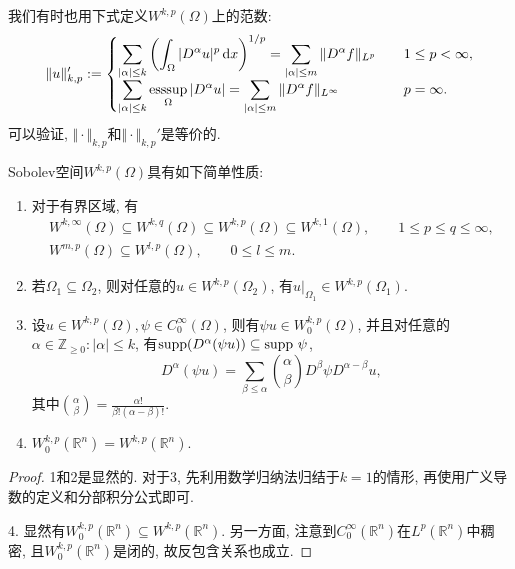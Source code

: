\begin{remark}
    我们有时也用下式定义$W^{k, p}(\Omega)$上的范数:
    \begin{equation*}
        \Vert u \Vert_{k, p}' := 
        \begin{cases}
            \displaystyle\sum_{|\alpha| \leq k}\left(\int_{\Omega}|D^{\alpha}u|^p \,{\rm d}x\right)^{1/p} = \sum_{|\alpha| \leq m}\Vert D^{\alpha}f\Vert_{L^p} \quad &1 \leq p < \infty, \\ 
            \displaystyle\sum_{|\alpha| \leq k}\mathop{{\rm esssup}}\limits_{\Omega}|D^{\alpha}u| = \sum_{|\alpha| \leq m}\Vert D^{\alpha}f\Vert_{L^{\infty}} \quad &p = \infty.
        \end{cases}
    \end{equation*}
    可以验证, $\Vert \cdot \Vert_{k, p}$和$\Vert \cdot \Vert_{k, p}'$是等价的.
\end{remark}

\begin{proposition}
    Sobolev空间$W^{k, p}(\Omega)$具有如下简单性质:
    \begin{enumerate}
        \item 对于有界区域, 有 
        \begin{gather*}
            W^{k, \infty}(\Omega) \subseteq W^{k, q}(\Omega) \subseteq W^{k, p}(\Omega) \subseteq W^{k, 1}(\Omega), \qquad 1 \leq p \leq q \leq \infty, \\ 
            W^{m, p}(\Omega) \subseteq W^{l, p}(\Omega), \qquad 0 \leq l \leq m.
        \end{gather*}
        \item 若$\Omega_1 \subseteq \Omega_2$, 则对任意的$u \in W^{k, p}(\Omega_2)$, 有$u|_{\Omega_1} \in W^{k, p}(\Omega_1)$.
        \item 设$u \in W^{k, p}(\Omega), \psi \in C_0^{\infty}(\Omega)$, 则有$\psi u \in W_0^{k, p}(\Omega)$, 并且对任意的$\alpha \in \mathbb{Z}_{\geq 0}\colon |\alpha| \leq k$, 有${\rm supp}(D^{\alpha}(\psi u)) \subseteq {\rm supp}\ \psi$, 
        \begin{equation*}
            D^{\alpha}(\psi u) = \sum_{\beta \leq \alpha}\binom{\alpha}{\beta}D^{\beta}\psi D^{\alpha - \beta}u,
        \end{equation*} 
        其中$\binom{\alpha}{\beta} = \frac{\alpha!}{\beta!(\alpha - \beta)!}$.
        \item $W_0^{k, p}(\mathbb{R}^n) = W^{k, p}(\mathbb{R}^n)$.
    \end{enumerate}
    \begin{proof}
        1和2是显然的. 对于3, 先利用数学归纳法归结于$k = 1$的情形, 再使用广义导数的定义和分部积分公式即可.
        
        4. 显然有$W_0^{k, p}(\mathbb{R}^n) \subseteq W^{k, p}(\mathbb{R}^n)$.
        另一方面, 注意到$C_0^{\infty}(\mathbb{R}^n)$在$L^p(\mathbb{R}^n)$中稠密, 且$W_0^{k, p}(\mathbb{R}^n)$是闭的, 故反包含关系也成立.
    \end{proof}
\end{proposition}

